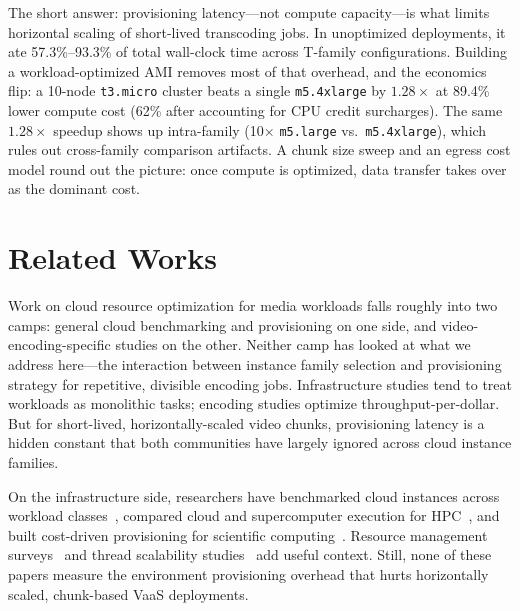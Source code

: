 \documentclass[conference]{IEEEtran}
\begin{document}
The short answer: provisioning latency---not compute capacity---is what limits horizontal scaling of short-lived transcoding jobs. In unoptimized deployments, it ate 57.3\%--93.3\% of total wall-clock time across T-family configurations. Building a workload-optimized AMI removes most of that overhead, and the economics flip: a 10-node \texttt{t3.micro} cluster beats a single \texttt{m5.4xlarge} by $1.28\times$ at 89.4\% lower compute cost (62\% after accounting for CPU credit surcharges). The same $1.28\times$ speedup shows up intra-family (10$\times$ \texttt{m5.large} vs.\ \texttt{m5.4xlarge}), which rules out cross-family comparison artifacts. A chunk size sweep and an egress cost model round out the picture: once compute is optimized, data transfer takes over as the dominant cost.

\section{Related Works}
\label{rel_works}

Work on cloud resource optimization for media workloads falls roughly into two camps: general cloud benchmarking and provisioning on one side, and video-encoding-specific studies on the other. Neither camp has looked at what we address here---the interaction between instance family selection and provisioning strategy for repetitive, divisible encoding jobs. Infrastructure studies tend to treat workloads as monolithic tasks; encoding studies optimize throughput-per-dollar. But for short-lived, horizontally-scaled video chunks, provisioning latency is a hidden constant that both communities have largely ignored across cloud instance families.

On the infrastructure side, researchers have benchmarked cloud instances across workload classes~\cite{b1}, compared cloud and supercomputer execution for HPC~\cite{b3}, and built cost-driven provisioning for scientific computing~\cite{b2}. Resource management surveys~\cite{b4} and thread scalability studies~\cite{b23} add useful context. Still, none of these papers measure the environment provisioning overhead that hurts horizontally scaled, chunk-based VaaS deployments.
\end{document}
